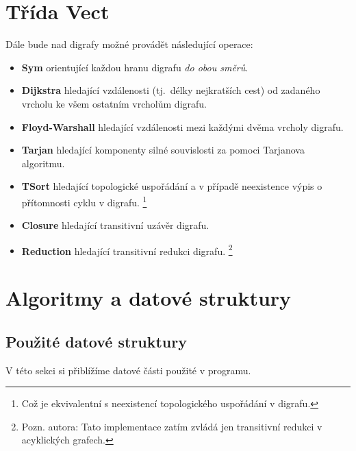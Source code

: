 \documentclass[11pt,a4paper]{article}
\begin{document}
\section{Třída Vect}

Dále bude nad digrafy možné provádět následující operace:

\renewcommand{\labelitemi}{$\clubsuit$}

\begin{itemize}
\item \textbf{Sym} orientující každou hranu digrafu {\sl do obou směrů\/}.
\item \textbf{Dijkstra} hledající vzdálenosti (tj.\ délky nejkratších cest) od
zadaného vrcholu ke všem ostatním vrcholům digrafu.
\item \textbf{Floyd-Warshall} hledající vzdálenosti mezi každými dvěma vrcholy
digrafu.
\item \textbf{Tarjan} hledající komponenty silné souvislosti za pomoci
Tarjanova algoritmu.
\item \textbf{TSort} hledající topologické uspořádání a v případě neexistence
výpis o přítomnosti cyklu v digrafu.%
\footnote{Což je ekvivalentní s neexistencí topologického uspořádání v digrafu.}
\item \textbf{Closure} hledající transitivní uzávěr digrafu.
\item \textbf{Reduction} hledající transitivní redukci digrafu.%
\footnote{Pozn. autora: Tato implementace zatím zvládá jen transitivní redukci
  v acyklických grafech.}
\end{itemize}

\section{Algoritmy a datové struktury}
\subsection{Použité datové struktury}
V této sekci si přiblížíme datové části použité v programu.
\end{document}
